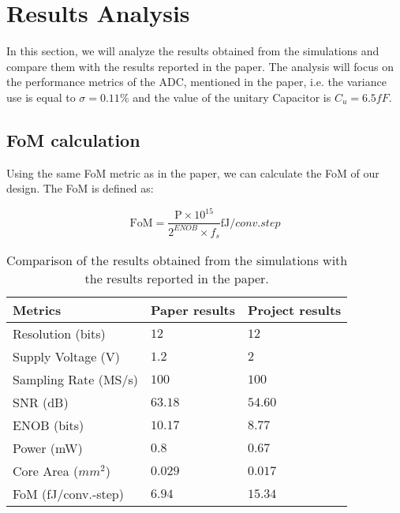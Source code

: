 \section{Results Analysis}
\label{sec:results}

In this section, we will analyze the results obtained from the simulations and compare them with the results reported in the paper. The analysis will focus on the performance metrics of the ADC, mentioned in the paper, i.e. the variance use is equal to $\sigma = 0.11\%$ and the value of the unitary Capacitor is $C_u = 6.5fF$.

\subsection{FoM calculation}

Using the same FoM metric as in the paper, we can calculate the FoM of our design. The FoM is defined as:

\begin{equation}
    \text{FoM} = \frac{\text{P} \times 10^{15}}{2^{ENOB} \times f_s } \si{\femto \joule \per conv.step}
    \label{eq:FoM}
\end{equation}

\begin{table}[h]
    \centering
    \caption{Comparison of the results obtained from the simulations with the results reported in the paper.}
    \begin{tabularx}{\textwidth}{>{\centering\arraybackslash}X >{\centering\arraybackslash}X >{\centering\arraybackslash}X }
        \toprule
        \textbf{Metrics} & \textbf{Paper results} & \textbf{Project results}\\
        \midrule
        Resolution (bits) & $12$ & $12$ \\
        \midrule
        Supply Voltage (V) & $1.2$ & $2$ \\
        \midrule
        Sampling Rate (MS/s) & $100$ & $100$  \\
        \midrule
        SNR (dB) & $63.18$ & $54.60$ \\
        \midrule
        ENOB (bits) & $10.17$ & $8.77$ \\
        \midrule
        Power (mW) & $0.8$ & $0.67$   \\
        \midrule
        Core Area ($mm^2$) & $0.029$ & $0.017$   \\
        \midrule
        FoM (fJ/conv.-step) & $6.94$ & $15.34$  \\
        \bottomrule
    \end{tabularx}
    \label{tab:comparison_results}
\end{table}

